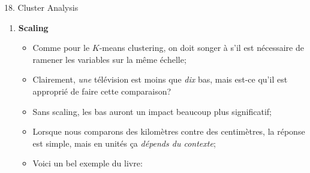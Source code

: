\documentclass[12pt, titlepage, french]{report}
\begin{document}
\begin{CHPT_SUMM}[label = {CLUSTERS}]{18. Cluster Analysis}
\begin{enumerate}
\begin{itemize}
		\end{itemize}
	\item[]	\textbf{Scaling}
		\begin{itemize}
		\item	Comme pour le $K$-means clustering, on doit songer à s'il est nécessaire de ramener les variables sur la même échelle;
		\item	Clairement, \textit{une} télévision est moins que \textit{dix} bas, mais est-ce qu'il est approprié de faire cette comparaison?
		\item[]	Sans scaling, les bas auront un impact beaucoup plus significatif;
		\item	Lorsque nous comparons des kilomètres contre des centimètres, la réponse est simple, mais en unités ça \textit{dépends du contexte};
		\item	Voici un bel exemple du livre:
		\end{itemize}
		

\end{enumerate}
\end{CHPT_SUMM}
\end{document}
